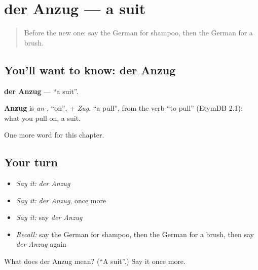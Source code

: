 \section[der Anzug]{der Anzug — a suit}

\label{lesson:GE-C202-anzug}



\begin{quote}
Before the new one: say the German for shampoo, then the German for a brush.
\end{quote}

\subsection*{You'll want to know: der Anzug}
\textbf{der Anzug} — \textquotedblleft{}a suit\textquotedblright{}.

\begin{cousinweb}
\textbf{Anzug} is \emph{an-}, \textquotedblleft{}on\textquotedblright{}, + \emph{Zug}, \textquotedblleft{}a pull\textquotedblright{}, from the verb \textquotedblleft{}to pull\textquotedblright{} (EtymDB 2.1): what you pull on, a suit.
\end{cousinweb}

\begin{grammarlens}[title={What you've built}]
One more word for this chapter.
\end{grammarlens}

\subsection*{Your turn}
\begin{itemize}
\raggedright
  \item \emph{Say it:} \emph{der Anzug}
  \item \emph{Say it:} \emph{der Anzug}, once more
  \item \emph{Say it:} say \emph{der Anzug}
  \item \emph{Recall:} say the German for shampoo, then the German for a brush, then say \emph{der Anzug} again
\end{itemize}

\begin{tcolorbox}[breakable,colback=teal!4,colframe=teal!35!black,title={Before you move on}]
What does der Anzug mean? (\textquotedblleft{}A suit\textquotedblright{}.) Say it once more.
\end{tcolorbox}
